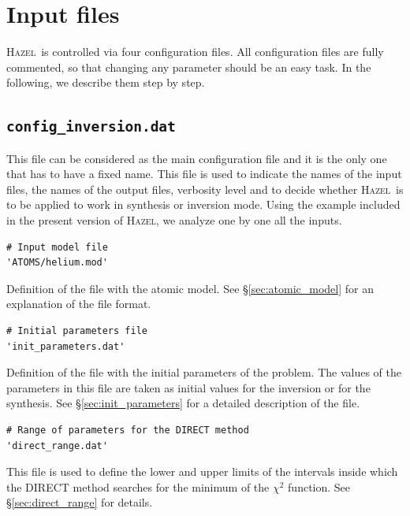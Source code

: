 \documentclass[12pt]{article}
\def\H{\textsc{Hazel}}
\begin{document}
\section{Input files}
\H\ is controlled via four configuration files. All configuration files are fully
commented, so that changing any parameter should be an easy task. In the following, we describe them step by step.


\subsection{\texttt{config\_inversion.dat}}
This file can be considered as the main configuration file and it is the only
one that has to have a fixed name. This file is used to indicate the names of the
input files, the names of the output files, verbosity level and to decide
whether \H\ is to be applied to work in synthesis or inversion mode. Using the example included
in the present version of \H, we analyze one by one all the inputs.

\begin{verbatim}
# Input model file
'ATOMS/helium.mod'
\end{verbatim}
Definition of the file with the atomic model. See \S\ref{sec:atomic_model} for an explanation of
the file format.

\begin{verbatim}
# Initial parameters file
'init_parameters.dat'
\end{verbatim}
Definition of the file with the initial parameters of the problem. The values of the
parameters in this file are taken as initial values for the inversion or for
the synthesis. See \S\ref{sec:init_parameters} for a detailed description of
the file.

\begin{verbatim}
# Range of parameters for the DIRECT method
'direct_range.dat'
\end{verbatim}
This file is used to define the lower and upper limits of the intervals inside which the
DIRECT method searches for the minimum of the $\chi^2$ function. See \S\ref{sec:direct_range}
for details.
\end{document}
